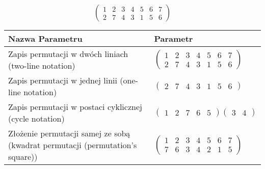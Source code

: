 \documentclass[12pt]{article}
\begin{document}
\subsection{}
\begin{center}
\[
\begin{pmatrix}
	1 & 2 & 3 & 4 & 5 & 6 & 7 \\ 
	2 & 7 & 4 & 3 & 1 & 5 & 6 
\end{pmatrix}
\]

\begin{tabular}{|m{0.6\linewidth}|m{0.4\linewidth}|}
	\hline
	Nazwa Parametru & Parametr \\
	\hline
	Zapis permutacji w dwóch liniach (two-line notation) & $\begin{pmatrix} 1 & 2 & 3 & 4 & 5 & 6 & 7 \\ 
2 & 7 & 4 & 3 & 1 & 5 & 6 \end{pmatrix}$ \\ 
	\hline
	Zapis permutacji w jednej linii (one-line notation) & $\begin{pmatrix} 2 & 7 & 4 & 3 & 1 & 5 & 6 \end{pmatrix}$ \\ 
	\hline
	Zapis permutacji w postaci cyklicznej (cycle notation) & $\begin{pmatrix} 1 & 2 & 7 & 6 & 5 \end{pmatrix} \begin{pmatrix} 3 & 4 \end{pmatrix} $ \\ 
	\hline
	Złożenie permutacji samej ze sobą (kwadrat permutacji (permutation's square)) & $\begin{pmatrix} 1 & 2 & 3 & 4 & 5 & 6 & 7 \\ 
7 & 6 & 3 & 4 & 2 & 1 & 5 \end{pmatrix}$ \\ 
	\hline
\end{tabular}
\end{center}
\end{document}
